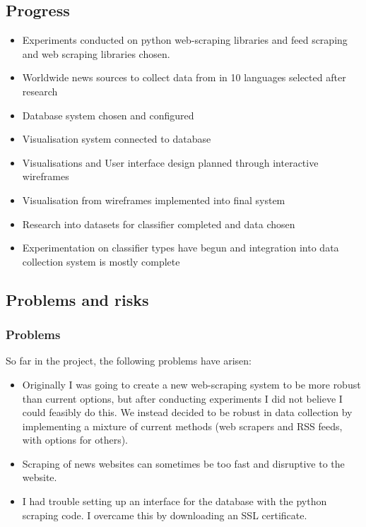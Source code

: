 \documentclass[11pt]{article}
\begin{document}
\subsection{Progress}\label{progress}
\begin{itemize}
    \tightlist
\item Experiments conducted on python web-scraping libraries and feed scraping and web scraping libraries chosen.
\item Worldwide news sources to collect data from in 10 languages selected after research
\item  Database system chosen and configured
\item  Visualisation system connected to database
\item  Visualisations and User interface design planned through interactive wireframes
\item  Visualisation from wireframes implemented into final system
\item  Research into datasets for classifier completed and data chosen
\item  Experimentation on classifier types have begun and integration into data collection system is mostly complete
\end{itemize}

\subsection{Problems and risks}\label{problems-and-risks}

\subsubsection{Problems}\label{problems}
So far in the project, the following problems have arisen:
\begin{itemize}
    \tightlist
\item Originally I was going to create a new web-scraping system to be more robust than current options, but after conducting experiments I did not believe I could feasibly do this. We instead decided to be robust in data collection by implementing a mixture of current methods (web scrapers and RSS feeds, with options for others).
\item Scraping of news websites can sometimes be too fast and disruptive to the website.
\item I had trouble setting up an interface for the database with the python scraping code. I overcame this by downloading an SSL certificate.
\end{itemize}
\end{document}
